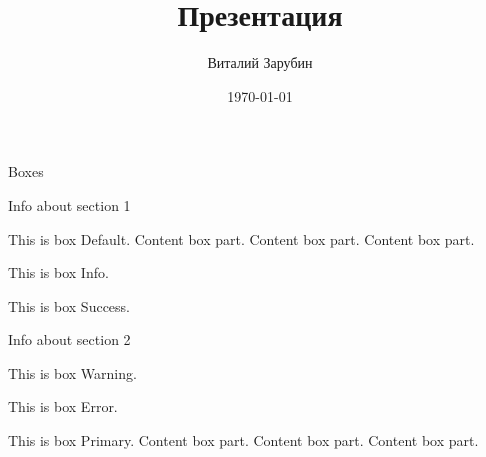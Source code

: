 \documentclass{beamer}
\author{Виталий Зарубин}
\title{Презентация}
\date{\today}
\begin{document}
    \begin{frame}
        \titlepage
    \end{frame}

    \begin{frame}{Boxes}

        \begin{multicols}{2}

            Info about section 1

            \begin{mybox}
                This is box Default.
                \tcblower
                Content box part.
                Content box part.
                Content box part.
            \end{mybox}

            \begin{myboxinfo}
                This is box Info.
            \end{myboxinfo}

            \begin{myboxsuccess}
                This is box Success.
            \end{myboxsuccess}

            \columnbreak

            Info about section 2

            \begin{myboxwarning}
                This is box Warning.
            \end{myboxwarning}

            \begin{myboxerror}
                This is box Error.
            \end{myboxerror}

            \begin{myboxprimary}
                This is box Primary.
                \tcblower
                Content box part.
                Content box part.
                Content box part.
            \end{myboxprimary}

        \end{multicols}
    \end{frame}
\end{document}
